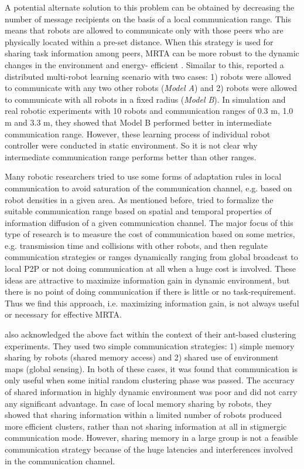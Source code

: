 A potential alternate solution to this problem can be obtained by decreasing the number of message recipients on the basis of a local communication range. This means that robots are allowed to communicate only with those peers who are physically located within a pre-set distance. When this strategy is used for sharing task information among peers, MRTA can be more robust to the dynamic changes in the environment and energy- efficient \cite{Agassounon+2002}. Simailar to this,  reported a distributed multi-robot learning scenario with two cases: 1) robots were allowed to communicate with any two other robots ({\em Model A}) and 2)  robots were allowed to communicate with all robots in a fixed radius ({\em Model B}). In simulation and real robotic experiments with 10 robots and communication ranges of 0.3 m, 1.0 m and 3.3 m, they showed that Model B performed better in intermediate communication range. However, these learning process of individual robot controller were  conducted  in static environment.  So it is not clear why intermediate communication range performs better than other ranges. 

Many robotic researchers tried to use some forms of adaptation rules in local communication to avoid saturation of the communication channel, e.g. based on robot densities in a given area.  As mentioned before,   tried to formalize the suitable communication range based on spatial and temporal properties of information diffusion of a given communication channel. The major focus of this type of research is to measure the cost of communication based on some metrics, e.g.  transmission time and collisions with other robots, and then regulate communication strategies or ranges dynamically ranging from global broadcast to local P2P or not doing communication at all when a huge cost is involved. These ideas are attractive to maximize information gain in dynamic environment, but there is no point of doing communication if there is little or no task-requirement. Thus we find this approach, i.e. maximizing information gain,  is not always useful or necessary for effective MRTA.

\cite{Oca+2005} also acknowledged the above fact within the context of their ant-based clustering experiments. They used two simple communication strategies: 1) simple memory sharing by robots (shared memory access) and 2) shared use of environment maps (global sensing). In both of these cases, it was found that communication is only useful when some initial random clustering phase was passed. The accuracy of shared information in highly dynamic environment was poor and did not carry any significant advantage. In case of local memory sharing by robots, they showed that  sharing information within a limited number of robots produced more efficient  clusters, rather than  not sharing information at all in stigmergic communication mode. However, sharing memory in a large group is not a feasible communication strategy because of the huge latencies and interferences involved in the communication channel.
